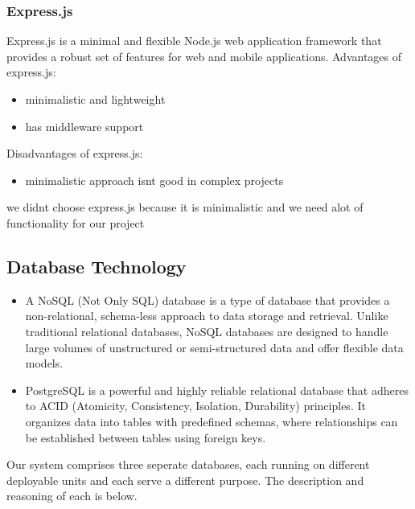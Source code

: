 \documentclass[12pt]{article}
\begin{document}
\subsubsection{Express.js}
Express.js is a minimal and flexible Node.js web application framework that provides a robust set of features for web and mobile applications.
Advantages of express.js:
\begin{itemize}
    \item minimalistic and lightweight
    \item has middleware support
\end{itemize}
Disadvantages of express.js:
\begin{itemize}
    \item minimalistic approach isnt good in complex projects
\end{itemize}
we didnt choose express.js because it is minimalistic and we need alot of functionality for our project
\subsection{Database Technology}
\begin{itemize}
    \item A NoSQL (Not Only SQL) database is a type of database that provides a non-relational, schema-less approach to data storage and retrieval. Unlike traditional relational databases, NoSQL databases are designed to handle large volumes of unstructured or semi-structured data and offer flexible data models.
    \item PostgreSQL is a powerful and highly reliable relational database that adheres to ACID (Atomicity, Consistency, Isolation, Durability) principles. It organizes data into tables with predefined schemas, where relationships can be established between tables using foreign keys.
\end{itemize}
Our system comprises three seperate databases, each running on different deployable units and each serve a different purpose. The description and reasoning of each is below.
\end{document}
